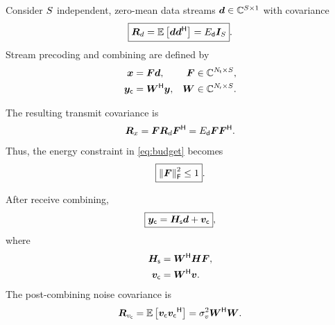 Consider $S$ independent, zero-mean data streams
$\bm{d}\in\mathbb{C}^{S\times1}$ with covariance
\begin{equation}\label{eq:data_cov}
	\boxed{
		\bm{R}_d
		=\mathbb{E}\left[\bm{d}{\bm{d}}^{\mathsf{H}}\right]
		=E_{\mathsf{d}}\bm{I}_{S}}.
\end{equation}
Stream precoding and combining are defined by
\begin{align}
	\bm{x}&=\bm{F}\bm{d},
	&\bm{F}&\in\mathbb{C}^{N_{\mathsf{t}}\times S},
	\label{eq:stream_precoder}\\
	\bm{y}_{\mathsf c}&={\bm{W}}^{\mathsf{H}}\bm{y},
	&\bm{W}&\in\mathbb{C}^{N_{\mathsf{r}}\times S}.
	\label{eq:stream_combiner}
\end{align}

The resulting transmit covariance is
\begin{equation*}
	\bm{R}_x
	=\bm{F}\bm{R}_d{\bm{F}}^{\mathsf{H}}
	=E_{\mathsf{d}}\bm{F}{\bm{F}}^{\mathsf{H}}.
\end{equation*}
Thus, the energy constraint in \eqref{eq:budget} becomes
\begin{equation}\label{eq:F_constraint}
	\boxed{\left\|\bm{F}\right\|_{\mathsf{F}}^2\leq1}.
\end{equation}

After receive combining,
\begin{equation}\label{eq:effective_stream_model}
	\boxed{
		\bm{y}_{\mathsf c}
		=\bm{H}_{\mathsf{s}}\bm{d}+\bm{v}_{\mathsf c}},
\end{equation}
where
\begin{align*}
	\bm{H}_{\mathsf{s}}&={\bm{W}}^{\mathsf{H}}\bm{H}\bm{F},\\
	\bm{v}_{\mathsf c}&={\bm{W}}^{\mathsf{H}}\bm{v}.
\end{align*}
The post-combining noise covariance is
\begin{equation}\label{eq:post_noise_cov}
	\bm{R}_{v_{\mathsf c}}
	=\mathbb{E}\left[\bm{v}_{\mathsf c}{\bm{v}_{\mathsf c}}^{\mathsf{H}}\right]
	=\sigma_v^2{\bm{W}}^{\mathsf{H}}\bm{W}.
\end{equation}

